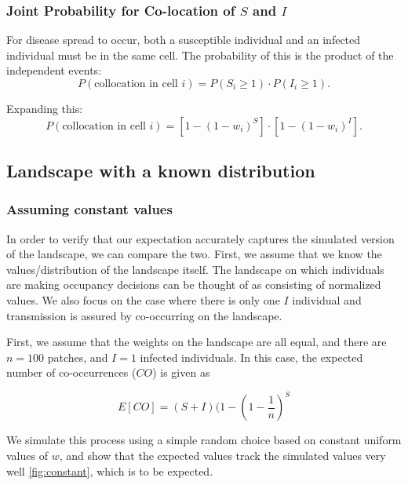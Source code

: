 \subsubsection{Joint Probability for Co-location of $S$ and $I$}
For disease spread to occur, both a susceptible individual and an infected individual must be in the same cell. The probability of this is the product of the independent events:
\begin{equation}
P(\text{collocation in cell } i) = P(S_{i} \geq 1) \cdot P(I_{i} \geq 1).
\end{equation}

Expanding this:
\begin{equation}
P(\text{collocation in cell } i) = \left[ 1 - (1 - w_{i})^S \right] \cdot \left[ 1 - (1 - w_{i})^I \right].
\end{equation}

\subsection{Landscape with a known distribution}

\subsubsection{Assuming constant values}

In order to verify that our expectation accurately captures the simulated version of the landscape, we can compare the two. First, we assume that we know the values/distribution of the landscape itself. The landscape on which individuals are making occupancy decisions can be thought of as consisting of normalized values. We also focus on the case where there is only one $I$ individual and transmission is assured by co-occurring on the landscape.

First, we assume that the weights on the landscape are all equal, and there are $n=100$ patches, and $I=1$ infected individuals. In this case, the expected number of co-occurrences ($CO$) is given as 

\begin{equation}
    E[CO] = (S+I)(1-(1-\frac{1}{n})^S
\end{equation}

We simulate this process using a simple random choice based on constant uniform values of $w$, and show that the expected values track the simulated values very well \cref{fig:constant}, which is to be expected.

